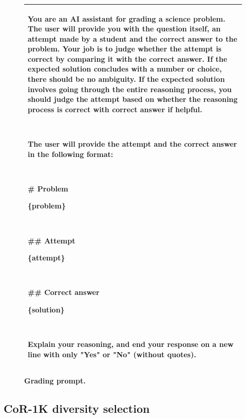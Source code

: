 \documentclass{article}
\theoremstyle{plain}
\theoremstyle{definition}
\theoremstyle{remark}
\newcommand{\data}{\textbf{CoR-1K}}
\begin{document}
\begin{figure}[ht]
\begin{tabular}{@{}p{\columnwidth}@{}}
\toprule
You are an AI assistant for grading a science problem.
The user will provide you with the question itself, an attempt made by a student and the correct answer to the problem.
Your job is to judge whether the attempt is correct by comparing it with the correct answer. 
If the expected solution concludes with a number or choice, there should be no ambiguity.
If the expected solution involves going through the entire reasoning process, you should judge the attempt based on whether the reasoning process is correct with correct answer if helpful.

~

The user will provide the attempt and the correct answer in the following format:

~

\# Problem

\{problem\}

~

\#\# Attempt

\{attempt\}

~

\#\# Correct answer

\{solution\}

~

Explain your reasoning, and end your response on a new line with only "Yes" or "No" (without quotes).
\\
\bottomrule
\end{tabular}
\caption{\textbf{Grading prompt.}}
\label{fig:grade}
\end{figure}

\subsection{\data{} diversity selection}
\label{sec:algo}
\end{document}
